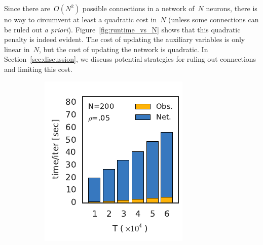 Since there are~$O(N^2)$ possible connections in a network of~$N$
neurons, there is no way to circumvent at least a quadratic cost
in~$N$ (unless some connections can be ruled out \textit{a priori}).
Figure~\ref{fig:runtime_vs_N} shows that this quadratic penalty is
indeed evident. The cost of updating the auxiliary variables is only
linear in~$N$, but the cost of updating the network is quadratic. In
Section~\ref{sec:discussion}, we discuss potential strategies for
ruling out connections and limiting this cost.


\begin{figure}[t!]
  \centering
  \vspace{-.2in}
  \begin{subfigure}[b]{1.81in}
    \centering
    \caption{}
    \vspace{-.25in}
    \includegraphics[width=\textwidth]{figures/ch3/runtime_vs_T.pdf}
    \label{fig:runtime_vs_T}
  \end{subfigure}
  ~
  \begin{subfigure}[b]{2.17in}
    \centering
    \caption{}
    \vspace{-.25in}

\end{subfigure}
\end{figure}
